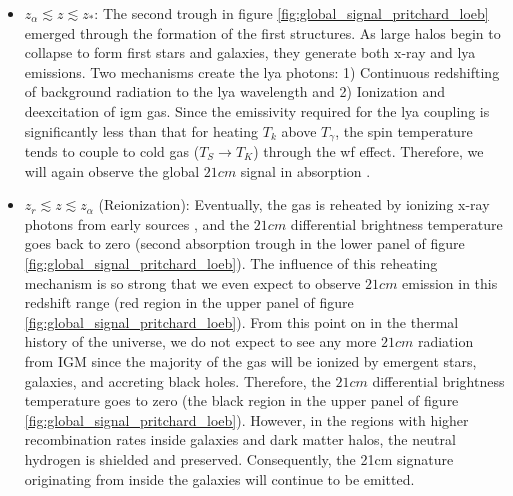 \documentclass[12pt, TexShade, letterpaper]{report}
\begin{document}
\begin{itemize}
\item $z_\alpha \lesssim z \lesssim z_*$: The second trough in figure \ref{fig:global_signal_pritchard_loeb} emerged through the formation of the first structures. As large halos begin to collapse to form first stars and galaxies, they generate both x-ray and \gls{lya} emissions. Two mechanisms create the \gls{lya} photons: 1) Continuous redshifting of background radiation to the \gls{lya} wavelength and 2) Ionization and deexcitation of \gls{igm} gas. Since the emissivity required for the \gls{lya} coupling is significantly less than that for heating $T_k$ above $T_\gamma$, the spin temperature tends to couple to cold gas ($T_S \rightarrow T_K$) through the \gls{wf} effect. Therefore, we will again observe the global $21cm$ signal in absorption \cite{map_universe, 21century}.\par

\item $z_r \lesssim z \lesssim z_\alpha$ (Reionization): Eventually, the gas is reheated by ionizing x-ray photons from early sources \cite{21century}, and the $21cm$ differential brightness temperature goes back to zero (second absorption trough in the lower panel of figure \ref{fig:global_signal_pritchard_loeb}). The influence of this reheating mechanism is so strong that we even expect to observe $21cm$ emission in this redshift range (red region in the upper panel of figure \ref{fig:global_signal_pritchard_loeb}). From this point on in the thermal history of the universe, we do not expect to see any more $21cm$ radiation from IGM since the majority of the gas will be ionized by emergent stars, galaxies, and accreting black holes. Therefore, the $21cm$ differential brightness temperature goes to zero (the black region in the upper panel of figure \ref{fig:global_signal_pritchard_loeb}). However, in the regions with higher recombination rates inside galaxies and dark matter halos, the neutral hydrogen is shielded and preserved. Consequently, the 21cm signature originating from inside the galaxies will continue to be emitted\cite{map_universe, 21century}.\par
\end{itemize}
\end{document}
